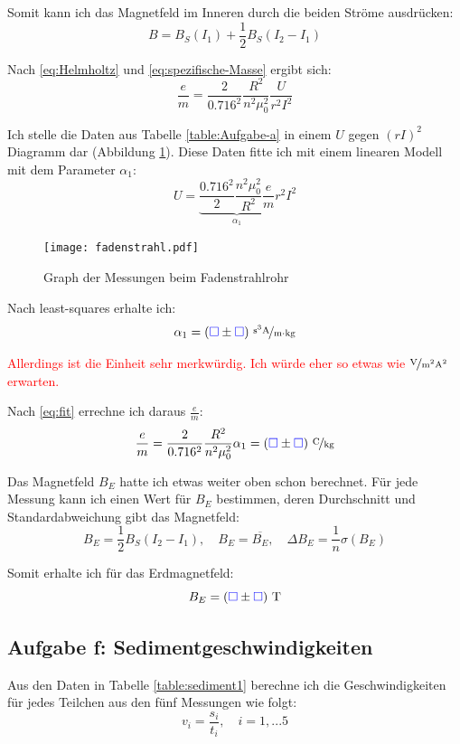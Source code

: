 \documentclass[11pt]{article}
\newcommand{\emesswert}{\left(\messwert \pm \messwert \right)}
\newcommand{\half}{\frac{1}{2}}
\newcommand{\messwert}{\textcolor{blue}{\square}}
\begin{document}
Somit kann ich das Magnetfeld im Inneren durch die beiden Ströme ausdrücken:
\begin{equation}
	\label{eq:Magnetfeld-im-Inneren}
	B = B_S(I_1) + \half B_S(I_2 - I_1)
\end{equation}

Nach \eqref{eq:Helmholtz} und \eqref{eq:spezifische-Masse} ergibt sich:
\begin{equation}
	\label{eq:fit}
	\frac em = \frac{2}{0.716^2} \frac{R^2}{n^2 \mu_0^2} \frac{U}{r^2 I^2}
\end{equation}

Ich stelle die Daten aus Tabelle \ref{table:Aufgabe-a} in einem $U$ gegen
$(rI)^2$ Diagramm dar (Abbildung \ref{fig:graph-fadenstrahlrohr}). Diese Daten
fitte ich mit einem linearen Modell mit dem Parameter $\alpha_1$:
\[ U = \underbrace{\frac{0.716^2}{2} \frac{n^2 \mu_0^2}{R^2} \frac em}_{\alpha_1} r^2 I^2 \]

\begin{figure}[h!]
	\centering
	\texttt{[image: fadenstrahl.pdf]}
	\caption{Graph der Messungen beim Fadenstrahlrohr}
	\label{fig:graph-fadenstrahlrohr}
\end{figure}

Nach least-squares erhalte ich:
\[ \alpha_1 = \unitfrac[\emesswert]{s^3 A}{m \cdot kg} \]

\textcolor{red}{Allerdings ist die Einheit sehr merkwürdig. Ich würde eher so
etwas wie $\unitfrac{V}{m^2 A^2}$ erwarten.}

Nach \eqref{eq:fit} errechne ich daraus $\frac em$:
\[
	\frac em
	= \frac{2}{0.716^2} \frac{R^2}{n^2 \mu_0^2} \alpha_1
	= \unitfrac[\emesswert] C{kg}
\]

Das Magnetfeld $B_E$ hatte ich etwas weiter oben schon berechnet. Für jede
Messung kann ich einen Wert für $B_E$ bestimmen, deren Durchschnitt und
Standardabweichung gibt das Magnetfeld:
\[
	B_E = \half B_S(I_2 - I_1)
	, \quad
	B_E = \overline{B_E}
	, \quad
	\Delta B_E = \frac 1n \sigma(B_E)
\]

Somit erhalte ich für das Erdmagnetfeld:
\[ B_E = \unit[\emesswert] T \]

\subsection{Aufgabe f: Sedimentgeschwindigkeiten}

\label{Auswertung-f}

Aus den Daten in Tabelle \ref{table:sediment1} berechne ich die
Geschwindigkeiten für jedes Teilchen aus den fünf Messungen wie folgt:
\[ v_i = \frac{s_i}{t_i}, \quad i = 1, ... 5 \]
\end{document}
